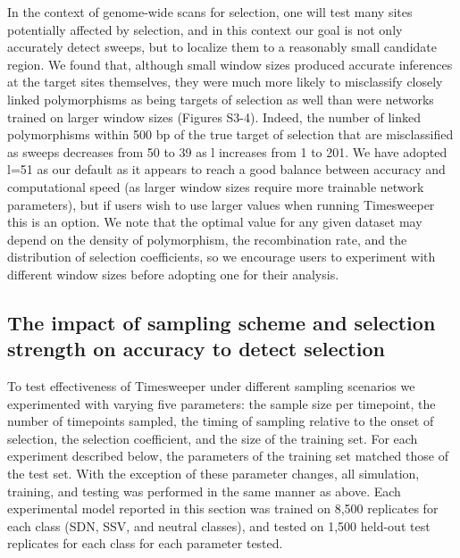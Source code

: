 In the context of genome-wide scans for selection, one will test many sites potentially affected by selection, and in this context our goal is not only accurately detect sweeps, but to localize them to a reasonably small candidate region. We found that, although small window sizes produced accurate inferences at the target sites themselves, they were much more likely to misclassify closely linked polymorphisms as being targets of selection as well than were networks trained on larger window sizes (Figures S3-4). Indeed, the number of linked polymorphisms within 500 bp of the true target of selection that are misclassified as sweeps decreases from 50 to 39 as l increases from 1 to 201. We have adopted l=51 as our default as it appears to reach a good balance between accuracy and computational speed (as larger window sizes require more trainable network parameters), but if users wish to use larger values when running Timesweeper this is an option. We note that the optimal value for any given dataset may depend on the density of polymorphism, the recombination rate, and the distribution of selection coefficients, so we encourage users to experiment with different window sizes before adopting one for their analysis.  \\

\subsection{The impact of sampling scheme and selection strength on accuracy to detect selection}

To test effectiveness of Timesweeper under different sampling scenarios we experimented with varying five parameters: the sample size per timepoint, the number of timepoints sampled, the timing of sampling relative to the onset of selection, the selection coefficient, and the size of the training set. For each experiment described below, the parameters of the training set matched those of the test set. With the exception of these parameter changes, all simulation, training, and testing was performed in the same manner as above. Each experimental model reported in this section was trained on 8,500 replicates for each class (SDN, SSV, and neutral classes), and tested on 1,500 held-out test replicates for each class for each parameter tested. \\


